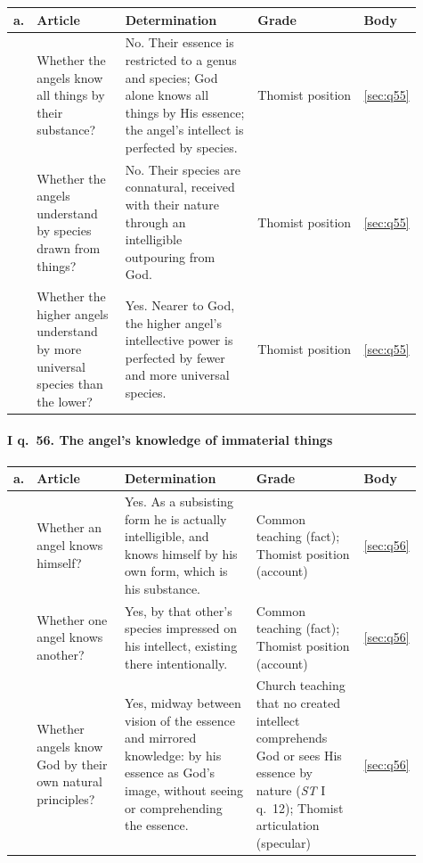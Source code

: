 \begingroup\footnotesize
\begin{longtable}{>{\raggedright\arraybackslash}p{0.03\linewidth}>{\raggedright\arraybackslash}p{0.22\linewidth}>{\raggedright\arraybackslash}p{0.33\linewidth}>{\raggedright\arraybackslash}p{0.27\linewidth}>{\raggedright\arraybackslash}p{0.06\linewidth}}
\toprule
\textbf{a.} & \textbf{Article} & \textbf{Determination} & \textbf{Grade} & \textbf{Body}\\
\midrule
\endhead
1 & Whether the angels know all things by their substance? & No. Their essence is restricted to a genus and species; God alone knows all things by His essence; the angel's intellect is perfected by species. & Thomist position & \ref{sec:q55}\\
2 & Whether the angels understand by species drawn from things? & No. Their species are connatural, received with their nature through an intelligible outpouring from God. & Thomist position & \ref{sec:q55}\\
3 & Whether the higher angels understand by more universal species than the lower? & Yes. Nearer to God, the higher angel's intellective power is perfected by fewer and more universal species. & Thomist position & \ref{sec:q55}\\
\bottomrule
\end{longtable}
\endgroup

\paragraph{I q.~56. The angel's knowledge of immaterial things}

\begingroup\footnotesize
\begin{longtable}{>{\raggedright\arraybackslash}p{0.03\linewidth}>{\raggedright\arraybackslash}p{0.22\linewidth}>{\raggedright\arraybackslash}p{0.33\linewidth}>{\raggedright\arraybackslash}p{0.27\linewidth}>{\raggedright\arraybackslash}p{0.06\linewidth}}
\toprule
\textbf{a.} & \textbf{Article} & \textbf{Determination} & \textbf{Grade} & \textbf{Body}\\
\midrule
\endhead
1 & Whether an angel knows himself? & Yes. As a subsisting form he is actually intelligible, and knows himself by his own form, which is his substance. & Common teaching (fact); Thomist position (account) & \ref{sec:q56}\\
2 & Whether one angel knows another? & Yes, by that other's species impressed on his intellect, existing there intentionally. & Common teaching (fact); Thomist position (account) & \ref{sec:q56}\\
3 & Whether angels know God by their own natural principles? & Yes, midway between vision of the essence and mirrored knowledge: by his essence as God's image, without seeing or comprehending the essence. & Church teaching that no created intellect comprehends God or sees His essence by nature (\emph{ST} I q.~12); Thomist articulation (specular) & \ref{sec:q56}\\
\bottomrule
\end{longtable}
\endgroup

